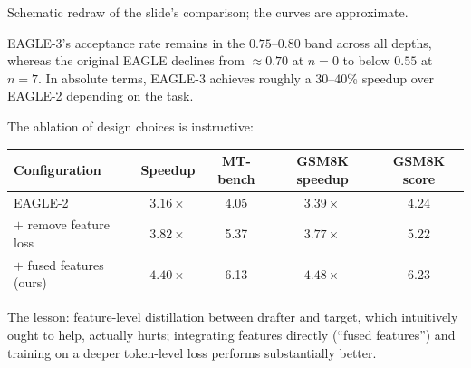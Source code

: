 \documentclass[11pt,a4paper]{article}
\theoremstyle{definition}
\theoremstyle{remark}
\theoremstyle{plain}
\begin{document}
\begin{center}
\par\smallskip
{\small Schematic redraw of the slide's comparison; the curves are
approximate.}
\end{center}

EAGLE-3's acceptance rate remains in the $0.75$--$0.80$ band across all
depths, whereas the original EAGLE declines from $\approx 0.70$ at $n=0$
to below $0.55$ at $n=7$. In absolute terms, EAGLE-3 achieves roughly a
30--40\% speedup over EAGLE-2 depending on the task.

The ablation of design choices is instructive:

\begin{center}
\renewcommand{\arraystretch}{1.25}
\begin{tabular}{@{}lcccc@{}}
\toprule
\textbf{Configuration} & \textbf{Speedup} & \textbf{MT-bench} & \textbf{GSM8K speedup} & \textbf{GSM8K score} \\
\midrule
EAGLE-2                          & $3.16\times$ & 4.05 & $3.39\times$ & 4.24 \\
\quad $+$ remove feature loss    & $3.82\times$ & 5.37 & $3.77\times$ & 5.22 \\
\quad $+$ fused features (ours)  & $4.40\times$ & 6.13 & $4.48\times$ & 6.23 \\
\bottomrule
\end{tabular}
\end{center}

The lesson: feature-level distillation between drafter and target, which
intuitively ought to help, actually hurts; integrating features directly
(``fused features'') and training on a deeper token-level loss performs
substantially better.
\end{document}
